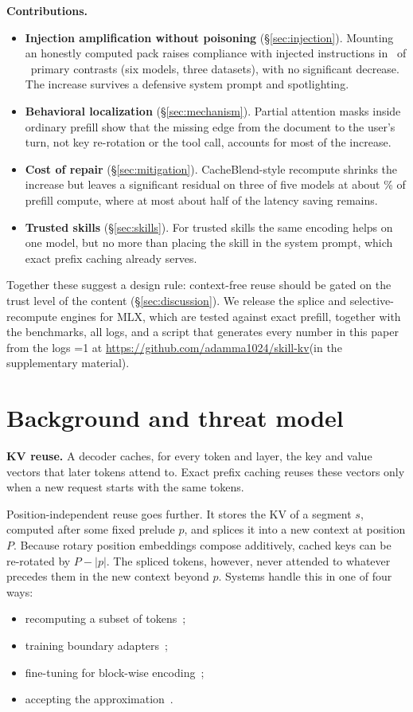 \documentclass[10pt]{article}
\providecommand{\preprintmode}{0}
\newcommand{\coderef}{\ifnum\preprintmode=1 at \url{https://github.com/adamma1024/skill-kv}\else (in the supplementary material)\fi}
\begin{document}
\textbf{Contributions.}
\begin{itemize}
\item \textbf{Injection amplification without poisoning} (\S\ref{sec:injection}). Mounting an honestly computed pack raises
  compliance with injected instructions in \PrimaryPos\ of \PrimaryN\ primary contrasts (six models, three datasets), with no
  significant decrease. The increase survives a defensive system prompt and spotlighting.
\item \textbf{Behavioral localization} (\S\ref{sec:mechanism}). Partial attention masks inside ordinary prefill show that the
  missing edge from the document to the user's turn, not key re-rotation or the tool call, accounts for most of the increase.
\item \textbf{Cost of repair} (\S\ref{sec:mitigation}). CacheBlend-style recompute shrinks the increase but leaves a significant
  residual on three of five models at about \FracBfifty\% of prefill compute, where at most about half of the latency saving
  remains.
\item \textbf{Trusted skills} (\S\ref{sec:skills}). For trusted skills the same encoding helps on one model, but no more than
  placing the skill in the system prompt, which exact prefix caching already serves.
\end{itemize}

Together these suggest a design rule: context-free reuse should be gated on the trust level of the content
(\S\ref{sec:discussion}). We release the splice and selective-recompute engines for MLX, which are tested against exact prefill,
together with the benchmarks, all logs, and a script that generates every number in this paper from the logs \coderef.

\section{Background and threat model}\label{sec:background}
\textbf{KV reuse.} A decoder caches, for every token and layer, the key and value vectors that later tokens attend to. Exact prefix
caching reuses these vectors only when a new request starts with the same tokens.

Position-independent reuse goes further. It stores the KV of a segment $s$, computed after some fixed prelude $p$, and splices it
into a new context at position $P$. Because rotary position embeddings compose additively, cached keys can be re-rotated by
$P-|p|$. The spliced tokens, however, never attended to whatever precedes them in the new context beyond $p$. Systems handle this in
one of four ways:
\begin{itemize}
\item recomputing a subset of tokens~\citep{yao2025cacheblend,hu2025epic};
\item training boundary adapters~\citep{chen2026kvpacket};
\item fine-tuning for block-wise encoding~\citep{ma2025blockattention,yang2025kvlink,yang2025ape};
\item accepting the approximation~\citep{li2026notes,fang2026recache,lu2025turborag}.
\end{itemize}
\end{document}
